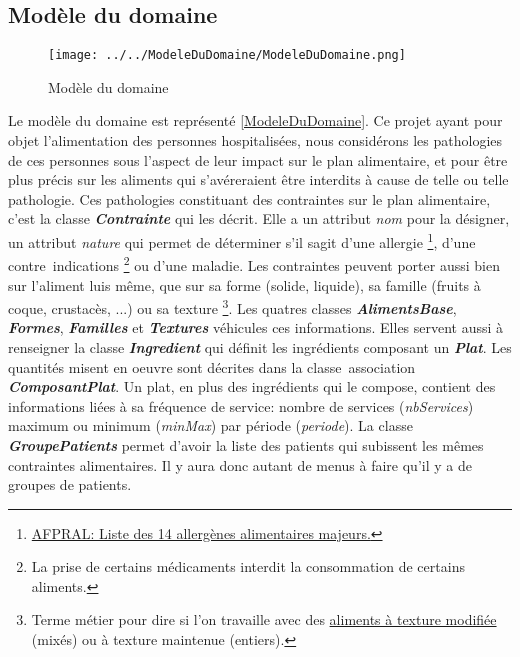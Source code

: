 \subsection{Modèle du domaine}
\begin{figure}
  \centering
      \texttt{[image: ../../ModeleDuDomaine/ModeleDuDomaine.png]} %
\caption{Modèle du domaine}
\label{ModeleDuDomaine}
\end{figure}

\newcommand{\classe}[1]{\emph{\textbf{#1}}}
\newcommand{\attribut}[1]{\emph{#1}}
\newcommand{\regleD}[1]{\textcolor{NavyBlue}{#1}}
\newcommand{\regleT}[1]{\textcolor{ForestGreen}{#1}}

Le modèle du domaine est représenté \autoref{ModeleDuDomaine}. Ce projet ayant pour objet l'alimentation des personnes hospitalisées, nous considérons les pathologies de ces personnes sous l'aspect de leur impact sur le plan alimentaire, et pour être plus précis sur les aliments qui s'avéreraient être interdits à cause de telle ou telle pathologie. Ces pathologies constituant des contraintes sur le plan alimentaire, c'est la classe \classe{Contrainte} qui les décrit. Elle a un attribut \attribut{nom} pour la désigner, un attribut \attribut{nature} qui permet de déterminer s'il sagit d'une allergie
\footnote{\label{allergies}\href{https://allergies.afpral.fr/allergie/en-savoir-plus-sur-les-allergies/alimentaires/89-liste-des-14-allergenes-alimentaires-majeurs}{AFPRAL: Liste des 14 allergènes alimentaires majeurs.}},
d'une contre~indications
\footnote{\label{contreIndications}La prise de certains médicaments interdit la consommation de certains aliments.}
ou d'une maladie.
Les contraintes peuvent porter aussi bien sur l'aliment luis même, que sur sa forme (solide, liquide), sa famille (fruits à coque, crustacès, ...) ou sa texture
\footnote{\label{textures}Terme métier pour dire si l'on travaille avec des \href{http://plone.vermeil.org:8080/ehpad/Bibliotheque/Memoires/annee-2012-2013/07 - Les textures modifiees et le plaisir de manger de Jacques Caby.pdf}{aliments à texture modifiée} (mixés) ou à texture maintenue (entiers).}.
Les quatres classes \classe{AlimentsBase}, \classe{Formes}, \classe{Familles} et \classe{Textures} véhicules ces informations. Elles servent aussi à renseigner la classe \classe{Ingredient} qui définit les ingrédients composant un \classe{Plat}. Les quantités misent en oeuvre sont décrites dans la classe~association \classe{ComposantPlat}. Un plat, en plus des ingrédients qui le compose, contient des informations liées à sa fréquence de service: nombre de services (\attribut{nbServices}) maximum ou minimum (\attribut{minMax}) par période (\attribut{periode}).
La classe \classe{GroupePatients} permet d'avoir la liste des patients qui subissent les mêmes contraintes alimentaires. Il y aura donc autant de menus à faire qu'il y a de groupes de patients.

